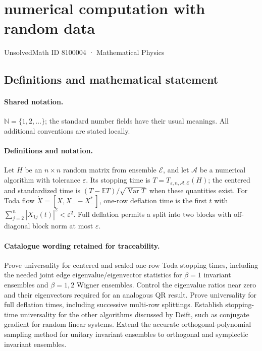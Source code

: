\documentclass[11pt]{article}
\begin{document}
\setcounter{section}{8100003}
\section{numerical computation with random data}\label{8100004}
{\small UnsolvedMath ID 8100004 · Mathematical Physics}
\subsection{Definitions and mathematical statement}

\paragraph{Shared notation.}$\mathbb N=\{1,2,\ldots\}$; the standard number fields have their usual meanings. All additional conventions are stated locally.


\paragraph{Definitions and notation.}Let $H$ be an $n\times n$ random matrix from ensemble $\mathcal E$, and let $\mathcal A$ be a numerical algorithm with tolerance $\varepsilon$. Its stopping time is $T=T_{\varepsilon,n,\mathcal A,\mathcal E}(H)$; the centered and standardized time is $(T-\mathbb ET)/\sqrt{\operatorname{Var}T}$ when these quantities exist. For Toda flow $\dot X=[X,X_--X_-^*]$, one-row deflation time is the first $t$ with $\sum_{j=2}^n|X_{1j}(t)|^2<\varepsilon^2$. Full deflation permits a split into two blocks with off-diagonal block norm at most $\varepsilon$.

\paragraph{Catalogue wording retained for traceability.}
Prove universality for centered and scaled one-row Toda stopping times, including the needed joint edge eigenvalue/eigenvector statistics for $\beta=1$ invariant ensembles and $\beta=1,2$ Wigner ensembles. Control the eigenvalue ratios near zero and their eigenvectors required for an analogous QR result. Prove universality for full deflation times, including successive multi-row splittings. Establish stopping-time universality for the other algorithms discussed by Deift, such as conjugate gradient for random linear systems. Extend the accurate orthogonal-polynomial sampling method for unitary invariant ensembles to orthogonal and symplectic invariant ensembles.
\end{document}
